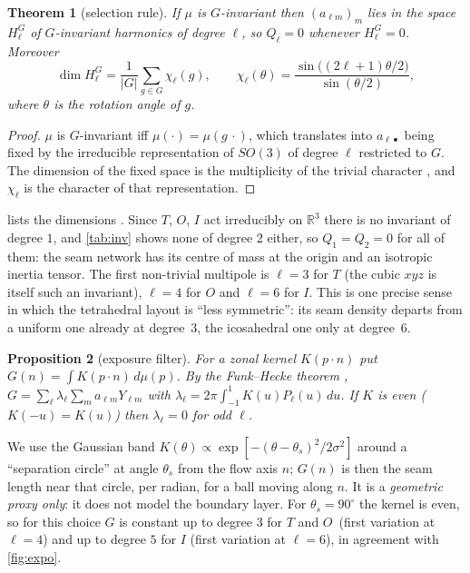 \documentclass[11pt]{article}
\newtheorem{theorem}{Theorem}
\newtheorem{proposition}[theorem]{Proposition}
\theoremstyle{definition}
\theoremstyle{remark}
\newcommand{\R}{\mathbb{R}}
\begin{document}
\begin{theorem}[selection rule]\label{thm:selection}
If $\mu$ is $G$-invariant then $(a_{\ell m})_m$ lies in the space $H_\ell^G$ of $G$-invariant harmonics of degree $\ell$, so $Q_\ell=0$ whenever $H_\ell^G=0$. Moreover
\begin{equation}
 \dim H_\ell^G=\frac1{|G|}\sum_{g\in G}\chi_\ell(g),\qquad \chi_\ell(\theta)=\frac{\sin\!\big((2\ell+1)\theta/2\big)}{\sin(\theta/2)},
\end{equation}
where $\theta$ is the rotation angle of $g$.
\end{theorem}
\begin{proof}
$\mu$ is $G$-invariant iff $\mu(\cdot)=\mu(g\,\cdot)$, which translates into $a_{\ell\bullet}$ being fixed by the irreducible representation of $SO(3)$ of degree $\ell$ restricted to $G$.
The dimension of the fixed space is the multiplicity of the trivial character \citep{serre_reps}, and $\chi_\ell$ is the character of that representation.
\end{proof}
 lists the dimensions \citep[cf.][]{stanley_invariants}. Since $T$, $O$, $I$ act irreducibly on $\R^3$ there is no invariant of degree $1$, and \cref{tab:inv} shows none of degree $2$ either, so $Q_1=Q_2=0$ for all of them: the seam network has its centre of mass at the
origin and an isotropic inertia tensor. The first non-trivial multipole is $\ell=3$ for $T$ (the cubic $xyz$ is itself such an invariant), $\ell=4$ for $O$ and $\ell=6$ for $I$.
This is one precise sense in which the tetrahedral layout is ``less symmetric'': its seam density departs from a uniform one already at degree~3, the icosahedral one only at degree~6.

\begin{table}[tbp]\centering\footnotesize

\caption{Dimension of the space of $G$-invariant spherical harmonics of degree $\ell$ (character formula).}\label{tab:inv}
\end{table}

\begin{proposition}[exposure filter]\label{prop:filter}
For a zonal kernel $K(p\cdot n)$ put $G(n)=\int K(p\cdot n)\,d\mu(p)$. By the Funk--Hecke theorem \citep{muller_harmonics}, $G=\sum_\ell\lambda_\ell\sum_ma_{\ell m}Y_{\ell m}$ with
$\lambda_\ell=2\pi\!\int_{-1}^1K(u)P_\ell(u)\,du$. If $K$ is even ($K(-u)=K(u)$) then $\lambda_\ell=0$ for odd $\ell$.
\end{proposition}
We use the Gaussian band $K(\theta)\propto\exp[-(\theta-\theta_s)^2/2\sigma^2]$ around a ``separation circle'' at angle $\theta_s$ from the flow axis $n$; $G(n)$ is then the seam length
near that circle, per radian, for a ball moving along $n$. It is a \emph{geometric proxy only}: it does not model the boundary layer. For $\theta_s=90^\circ$ the kernel is even, so for
this choice $G$ is constant up to degree $3$ for $T$ and $O$ \,(first variation at $\ell=4$) and up to degree $5$ for $I$ (first variation at $\ell=6$), in agreement with \cref{fig:expo}.
\end{document}
